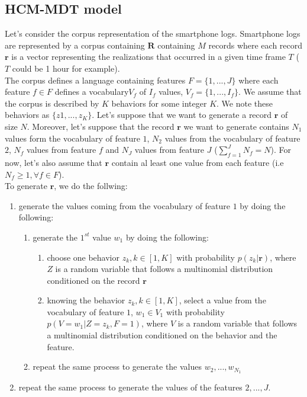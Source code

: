 \subsection{HCM-MDT model}

Let's consider the corpus representation of the smartphone logs. Smartphone logs are represented by a corpus  containing $\boldsymbol{R}$ containing $\mathit{M}$ records where each record $\mathbf{r}$ is a vector representing the realizations that occurred in a given time frame $\mathit{T}$ ($\mathit{T}$ could be 1 hour for example).
\\The corpus defines a language containing features $F=\{1,...,J\}$ where each feature $f\in F$ defines a vocabulary$V_{f}$ of $I_{f}$ values, $V_{f}=\{1,...,I_{f}\}$. We assume that the corpus is described by $K$ behaviors for some integer $K$. We note these behaviors as $\{z1,...,z_{K}\}$. Let's suppose that we want to generate a record $\mathbf{r}$ of size $N$. Moreover, let's suppose that the record $\mathbf{r}$ we want to generate contains $N_{1}$ values form the vocabulary of feature $1$, $N_{2}$ values from the vocabulary of feature $2$, $N_{f}$ values from feature $f$ and $N_{J}$ values from feature $J$ ($\sum_{f=1}^{J}N_{f}=N$). For now, let's also assume that $\mathbf{r}$ contain al least one value from each feature (i.e $N_{f}\geq 1,\forall f\in F$).
\\To generate $\mathbf{r}$, we do the follwing:
\begin{enumerate} 
	\item generate the values coming from the vocabulary of feature $1$ by doing the following:
	 	\begin{enumerate}
		 	\item generate the $1^{st}$ value $w_1$ by doing the following:
	 		 	\begin{enumerate}
		 			\item choose one behavior $z_{k},k\in [1,K]$ with probability $p(z_{k}|\mathbf{r})$, where $Z$ is a random variable that follows a multinomial distribution conditioned on the record $\mathbf{r}$
		 			\item knowing the behavior $z_{k},k\in [1,K]$, select a value from the vocabulary of feature $1$, $w_{1} \in V_{1}$ with probability $p(V=w_{1}|Z=z_{k},F=1)$, where $V$ is a random variable that follows a 							multinomial distribution conditioned on the behavior and the feature.
		 		\end{enumerate}
			\item repeat the same process to generate the values $w_{2},...,w_{N_{1}}$
		\end{enumerate} 
	\item repeat the same process to generate the values of the features $2,...,J$. 
\end{enumerate} \par
